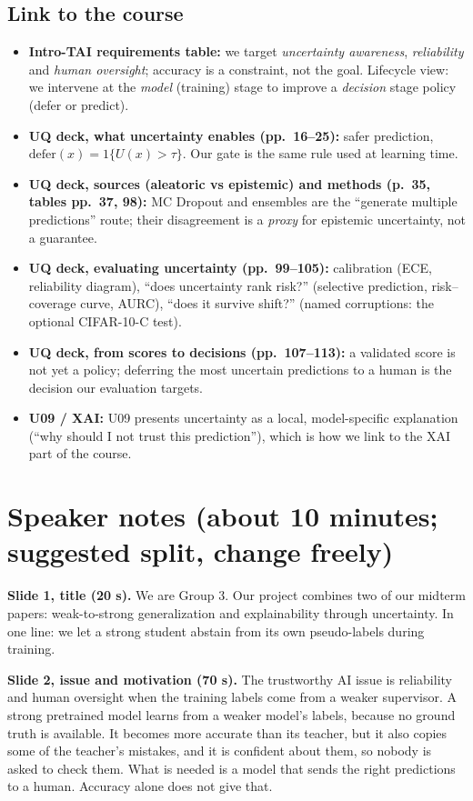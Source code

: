 \documentclass[10pt,a4paper]{article}
\begin{document}
\subsection{Link to the course}
\begin{itemize}
\item \textbf{Intro-TAI requirements table:} we target \emph{uncertainty awareness}, \emph{reliability} and
\emph{human oversight}; accuracy is a constraint, not the goal. Lifecycle view: we intervene at the
\emph{model} (training) stage to improve a \emph{decision} stage policy (defer or predict).
\item \textbf{UQ deck, what uncertainty enables (pp.\ 16--25):} safer prediction,
$\text{defer}(x)=1\{U(x)>\tau\}$. Our gate is the same rule used at learning time.
\item \textbf{UQ deck, sources (aleatoric vs epistemic) and methods (p.\ 35, tables pp.\ 37, 98):} MC Dropout and
ensembles are the ``generate multiple predictions'' route; their disagreement is a \emph{proxy} for epistemic
uncertainty, not a guarantee.
\item \textbf{UQ deck, evaluating uncertainty (pp.\ 99--105):} calibration (ECE, reliability diagram), ``does
uncertainty rank risk?'' (selective prediction, risk--coverage curve, AURC), ``does it survive shift?''
(named corruptions: the optional CIFAR-10-C test).
\item \textbf{UQ deck, from scores to decisions (pp.\ 107--113):} a validated score is not yet a policy; deferring
the most uncertain predictions to a human is the decision our evaluation targets.
\item \textbf{U09 / XAI:} U09 presents uncertainty as a local, model-specific explanation (``why should I not trust
this prediction''), which is how we link to the XAI part of the course.
\end{itemize}

\section{Speaker notes (about 10 minutes; suggested split, change freely)}
\textbf{Slide 1, title (20 s).} We are Group 3. Our project combines two of our midterm papers: weak-to-strong
generalization and explainability through uncertainty. In one line: we let a strong student abstain from its
own pseudo-labels during training.

\textbf{Slide 2, issue and motivation (70 s).} The trustworthy AI issue is reliability and human oversight when
the training labels come from a weaker supervisor. A strong pretrained model learns from a weaker model's
labels, because no ground truth is available. It becomes more accurate than its teacher, but it also copies
some of the teacher's mistakes, and it is confident about them, so nobody is asked to check them. What is
needed is a model that sends the right predictions to a human. Accuracy alone does not give that.
\end{document}
